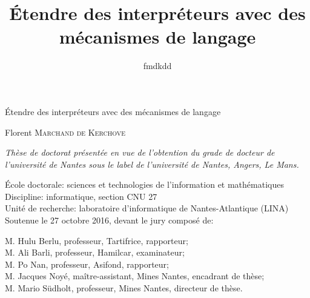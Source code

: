 

\newcommand{\titlefr}{Étendre des interpréteurs avec des mécanismes de langage}
\newcommand{\titleen}{Extending interpreters with language mechanisms}

\title{\titlefr}
\author{fmdkdd}




\frontmatter

\begin{titlepage}
\sffamily
\vspace{6cm}

\begin{raggedright}
\Huge\titlefr
\end{raggedright}

\vspace{1.5cm}

\LARGE
\noindent
Florent \textsc{Marchand de Kerchove}

\vfill

\begin{raggedright}
\rmfamily\normalsize
\itshape
Thèse de doctorat présentée en vue de l'obtention du
grade de docteur de l'université de Nantes
sous le label de l'université de Nantes, Angers, Le Mans.

\vspace{1em}
École doctorale: sciences et technologies de l'information et mathématiques\\
Discipline: informatique, section CNU 27\\
Unité de recherche: laboratoire d'informatique de Nantes-Atlantique (LINA)\\

\vspace{1em}
Soutenue le 27 octobre 2016, devant le jury composé de:

\vspace{0.5em}
M. Hulu Berlu, professeur, Tartifrice, rapporteur;\\
M. Ali Barli, professeur, Hamilcar, examinateur;\\
M. Po Nan, professeur, Asifond, rapporteur;\\
M. Jacques Noyé, maître-assistant, Mines Nantes, encadrant de thèse;\\
M. Mario Südholt, professeur, Mines Nantes, directeur de thèse.\\
\vspace{-2cm}
\end{raggedright}
\end{titlepage}

